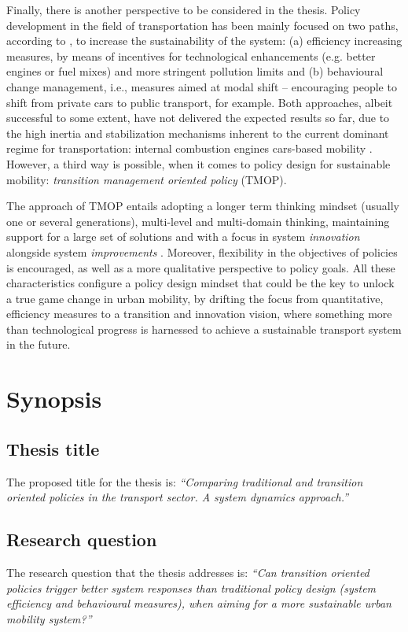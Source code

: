 \documentclass[a4paper,fontsize=10pt,bibliography=totoc]{scrartcl}
\begin{document}
\begin{multicols}{2}
Finally, there is another perspective to be considered in the thesis. Policy development in the field of transportation has been mainly focused on two paths, according to \textcite{koehler2009_transitionsmodelsustainable}, to increase the sustainability of the system: (a) efficiency increasing measures, by means of incentives for technological enhancements (e.g. better engines or fuel mixes) and more stringent pollution limits and (b) behavioural change management, i.e., measures aimed at modal shift -- encouraging people to shift from private cars to public transport, for example. Both approaches, albeit successful to some extent, have not delivered the expected results so far, due to the high inertia and stabilization mechanisms inherent to the current dominant regime for transportation: internal combustion engines cars-based mobility \parencite{geels2012_AutomobilityTransitionSocio}. However, a third way is possible, when it comes to policy design for sustainable mobility: \textit{transition management oriented policy} (TMOP).

The approach of TMOP entails adopting a longer term thinking mindset (usually one or several generations), multi-level and multi-domain thinking, maintaining support for a large set of solutions and with a focus in system \textit{innovation} alongside system \textit{improvements} \parencite{rotmans2001_Moreevolutionthan}. Moreover, flexibility in the objectives of policies is encouraged, as well as a more qualitative perspective to policy goals. All these characteristics configure a policy design mindset that could be the key to unlock a true game change in urban mobility, by drifting the focus from quantitative, efficiency measures to a transition and innovation vision, where something more than technological progress is harnessed to achieve a sustainable transport system in the future.

\section{Synopsis}
\label{s:synopsis}
\subsection*{Thesis title}
The proposed title for the thesis is: \textit{``Comparing traditional and transition oriented policies in the transport sector. A system dynamics approach.''}

\subsection*{Research question}
The research question that the thesis addresses is: \textit{``Can transition oriented policies trigger better system responses than traditional policy design (system efficiency and behavioural measures), when aiming for a more sustainable urban mobility system?''}


\end{multicols}
\end{document}
